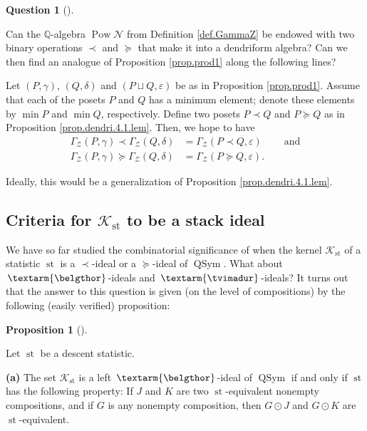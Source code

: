 \documentclass[numbers=enddot,12pt,final,onecolumn,notitlepage]{scrartcl}%
\theoremstyle{definition}
\newtheorem{prop}[theo]{Proposition}
\newenvironment{proposition}[1][]
{\begin{prop}[#1]\begin{leftbar}}
{\end{leftbar}\end{prop}}
\newtheorem{quest}[theo]{Question}
\newenvironment{question}[1][]
{\begin{quest}[#1]\begin{leftbar}}
{\end{leftbar}\end{quest}}
\newenvironment{question}[1][Question]{\noindent\textbf{#1.} }{\ \rule{0.5em}{0.5em}}
\newenvironment{verlong}{}{}
\newcommand{\tvi}{\left. \textarm{\tvimadur} \right.}
\newcommand{\bel}{\left. \textarm{\belgthor} \right.}
\begin{document}
\begin{verlong}
\begin{question}
Can the $\mathbb{Q}$-algebra $\operatorname*{Pow}\mathcal{N}$ from Definition
\ref{def.GammaZ} be endowed with two binary operations $\left.  \prec\right.
$ and $\left.  \succeq\right.  $ that make it into a dendriform algebra? Can
we then find an analogue of Proposition \ref{prop.prod1} along the following lines?

Let $\left(  P,\gamma\right)  $, $\left(  Q,\delta\right)  $ and $\left(
P\sqcup Q,\varepsilon\right)  $ be as in Proposition \ref{prop.prod1}. Assume
that each of the posets $P$ and $Q$ has a minimum element; denote these
elements by $\min P$ and $\min Q$, respectively. Define two posets $P\left.
\prec\right.  Q$ and $P\left.  \succeq\right.  Q$ as in Proposition
\ref{prop.dendri.4.1.lem}. Then, we hope to have%
\begin{align*}
\Gamma_{\mathcal{Z}}\left(  P,\gamma\right)  \left.  \prec\right.
\Gamma_{\mathcal{Z}}\left(  Q,\delta\right)   &  =\Gamma_{\mathcal{Z}}\left(
P\left.  \prec\right.  Q,\varepsilon\right)  \ \ \ \ \ \ \ \ \ \ \text{and}\\
\Gamma_{\mathcal{Z}}\left(  P,\gamma\right)  \left.  \succeq\right.
\Gamma_{\mathcal{Z}}\left(  Q,\delta\right)   &  =\Gamma_{\mathcal{Z}}\left(
P\left.  \succeq\right.  Q,\varepsilon\right)  .
\end{align*}


Ideally, this would be a generalization of Proposition
\ref{prop.dendri.4.1.lem}.
\end{question}

\subsection{Criteria for $\mathcal{K}_{\operatorname*{st}}$ to be a stack
ideal}

We have so far studied the combinatorial significance of when the kernel
$\mathcal{K}_{\operatorname*{st}}$ of a statistic $\operatorname*{st}$ is a
$\left.  \prec\right.  $-ideal or a $\left.  \succeq\right.  $-ideal of
$\operatorname*{QSym}$. What about $\bel$-ideals and $\tvi$-ideals? It turns
out that the answer to this question is given (on the level of compositions)
by the following (easily verified) proposition:

\begin{proposition}
\label{prop.bel-tvi-comp}Let $\operatorname*{st}$ be a descent statistic.

\textbf{(a)} The set $\mathcal{K}_{\operatorname*{st}}$ is a left $\bel$-ideal
of $\operatorname*{QSym}$ if and only if $\operatorname*{st}$ has the
following property: If $J$ and $K$ are two $\operatorname*{st}$-equivalent
nonempty compositions, and if $G$ is any nonempty composition, then $G\odot J$
and $G\odot K$ are $\operatorname*{st}$-equivalent.


\end{proposition}
\end{verlong}
\end{document}
